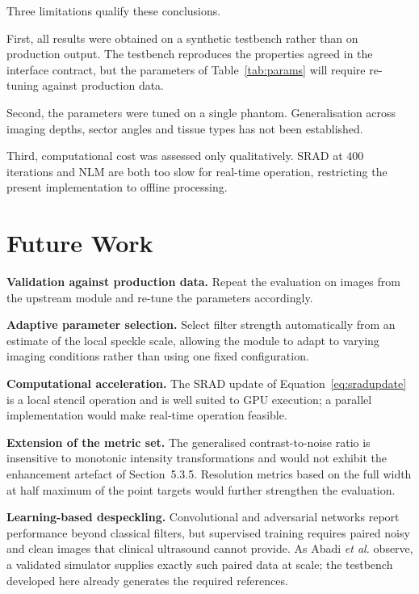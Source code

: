 \documentclass[12pt,a4paper,oneside]{report}
\begin{document}
Three limitations qualify these conclusions.

First, all results were obtained on a synthetic testbench rather than on
production output. The testbench reproduces the properties agreed in the interface
contract, but the parameters of Table~\ref{tab:params} will require re-tuning
against production data.

Second, the parameters were tuned on a single phantom. Generalisation across
imaging depths, sector angles and tissue types has not been established.

Third, computational cost was assessed only qualitatively. SRAD at $400$
iterations and NLM are both too slow for real-time operation, restricting the
present implementation to offline processing.

\section{Future Work}

\textbf{Validation against production data.} Repeat the evaluation on images from
the upstream module and re-tune the parameters accordingly.

\textbf{Adaptive parameter selection.} Select filter strength automatically from
an estimate of the local speckle scale, allowing the module to adapt to varying
imaging conditions rather than using one fixed configuration.

\textbf{Computational acceleration.} The SRAD update of
Equation~\eqref{eq:sradupdate} is a local stencil operation and is well suited to
GPU execution; a parallel implementation would make real-time operation feasible.

\textbf{Extension of the metric set.} The generalised contrast-to-noise ratio
\cite{rodriguez2020gcnr} is insensitive to monotonic intensity transformations and
would not exhibit the enhancement artefact of Section~5.3.5. Resolution metrics
based on the full width at half maximum of the point targets would further
strengthen the evaluation.

\textbf{Learning-based despeckling.} Convolutional and adversarial networks report
performance beyond classical filters, but supervised training requires paired
noisy and clean images that clinical ultrasound cannot provide. As Abadi
\emph{et al.} \cite{abadi2020vct} observe, a validated simulator supplies exactly
such paired data at scale; the testbench developed here already generates the
required references.

{\small{}

}
\end{document}
